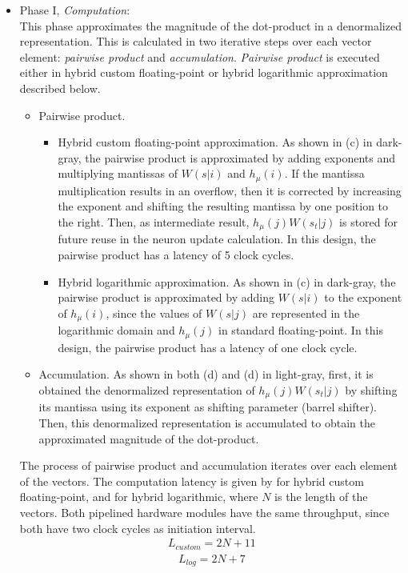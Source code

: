  \begin{itemize}
 	\item{Phase I, \emph{Computation}}: 
 	\\This phase approximates the magnitude of the dot-product in a denormalized representation. This is calculated in two iterative steps over each vector element: \emph{pairwise product} and \emph{accumulation}. \emph{Pairwise product} is executed either in hybrid custom floating-point or hybrid logarithmic approximation described below.
 	 \begin{itemize}[label={--}]
 	 	\item{Pairwise product}.
 	 	\begin{itemize} [label={--}]
	 		\item{Hybrid custom floating-point approximation}.
	 	 	As shown in (c) in dark-gray, the pairwise product is approximated by adding exponents and multiplying mantissas of $W(s|i)$ and $h_\mu(i)$. If the mantissa multiplication results in an overflow, then it is corrected by increasing the  exponent and shifting the resulting mantissa by one position to the right. Then, as intermediate result, $h_\mu(j) W(s_t|j)$ is stored for future reuse in the neuron update calculation. In this design, the pairwise product has a latency of 5 clock cycles.
	 	 	\item{Hybrid logarithmic approximation}.
	 	 	As shown in (c) in dark-gray, the pairwise product is approximated by adding $W(s|i)$ to the exponent of $h_\mu(i)$, since the values of $W(s|j)$ are represented in the logarithmic domain and $h_\mu(j)$ in standard floating-point. In this design, the pairwise product has a latency of one clock cycle.
 	 	\end{itemize}
 		\item{Accumulation}. As shown in both (d) and (d) in light-gray, first, it is obtained the denormalized representation of $h_\mu(j) W(s_t|j)$ by shifting its mantissa using its exponent as shifting parameter (barrel shifter). Then, this denormalized representation is accumulated to obtain the approximated magnitude of the dot-product.
 	 \end{itemize}
 	The process of pairwise product and accumulation iterates over each element of the vectors. The computation latency is given by  for hybrid custom floating-point, and  for hybrid logarithmic, where $N$ is the length of the vectors. Both pipelined hardware modules have the same throughput, since both have two clock cycles as initiation interval. 	
 	\begin{eqnarray} \label{eq:dot_standard_custom_float_latency}
 	L_{custom}=2N+11
 	\end{eqnarray} 	
	\begin{eqnarray} \label{eq:dot_log_latency}
 	L_{log}=2N+7
 	\end{eqnarray}
 	

\end{itemize}
